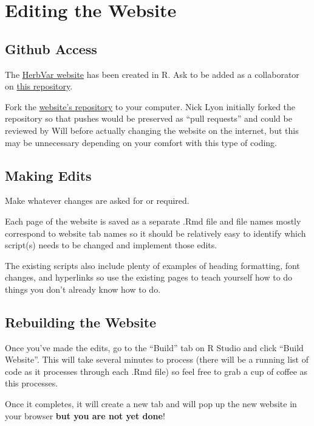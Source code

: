 \documentclass[
  letterpaper,
  oneside,
  open=any]{scrbook}
\begin{document}
\chapter{Editing the Website}\label{editing-the-website}

\section{Github Access}\label{github-access}

The \href{https://herbvar.org/index.html}{HerbVar website} has been
created in R. Ask to be added as a collaborator on
\href{https://github.com/HerbVar-Network/HerbVar-website}{this
repository}.

Fork the
\href{https://github.com/HerbVar-Network/HerbVar-website}{website's
repository} to your computer. Nick Lyon initially forked the repository
so that pushes would be preserved as ``pull requests'' and could be
reviewed by Will before actually changing the website on the internet,
but this may be unnecessary depending on your comfort with this type of
coding.

\section{Making Edits}\label{making-edits}

Make whatever changes are asked for or required.

Each page of the website is saved as a separate .Rmd file and file names
mostly correspond to website tab names so it should be relatively easy
to identify which script(s) needs to be changed and implement those
edits.

The existing scripts also include plenty of examples of heading
formatting, font changes, and hyperlinks so use the existing pages to
teach yourself how to do things you don't already know how to do.

\section{Rebuilding the Website}\label{rebuilding-the-website}

Once you've made the edits, go to the ``Build'' tab on R Studio and
click ``Build Website''. This will take several minutes to process
(there will be a running list of code as it processes through each .Rmd
file) so feel free to grab a cup of coffee as this processes.

Once it completes, it will create a new tab and will pop up the new
website in your browser \textbf{but you are not yet done}!
\end{document}
